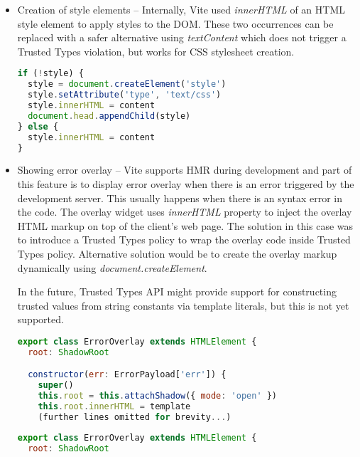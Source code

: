 \begin{itemize}
  \item Creation of style elements -- Internally, Vite used \emph{innerHTML} of an HTML style
        element to apply styles to the DOM. These two occurrences can be replaced with a
        safer alternative using \emph{textContent} which does not trigger a Trusted Types
        violation, but works for CSS stylesheet creation.

        \bigskip
        \begin{lstlisting}[language=JavaScript, caption=Creation of style elements using innerHTML in Vite \cite{commit_vite_inner_html_styles}]
if (!style) {
  style = document.createElement('style')
  style.setAttribute('type', 'text/css')
  style.innerHTML = content
  document.head.appendChild(style)
} else {
  style.innerHTML = content
}
\end{lstlisting}

  \item Showing error overlay -- Vite supports HMR during development and part of this feature is to
        display error overlay when there is an error triggered by the development server. This
        usually happens when there is an syntax error in the code. The overlay widget uses
        \emph{innerHTML} property to inject the overlay HTML markup on top of the client's web
        page. The solution in this case was to introduce a Trusted Types policy to wrap the overlay
        code inside Trusted Types policy. Alternative solution would be to create the overlay
        markup dynamically using \emph{document.createElement}.

        In the future, Trusted Types API might provide support for constructing trusted values from
        string constants via template literals, but this is not yet supported.

        \bigskip
        \begin{lstlisting}[language=JavaScript, caption=Creation of error overlay using innerHTML property \cite{commit_vite_inner_html_overlay}]
export class ErrorOverlay extends HTMLElement {
  root: ShadowRoot

  constructor(err: ErrorPayload['err']) {
    super()
    this.root = this.attachShadow({ mode: 'open' })
    this.root.innerHTML = template
    (further lines omitted for brevity...)
\end{lstlisting}

        \bigskip
        \begin{lstlisting}[language=JavaScript, caption=Creation of error overlay using Trusted Types policy \cite{commit_vite_policy_overlay}]
export class ErrorOverlay extends HTMLElement {
  root: ShadowRoot


\end{lstlisting}
\end{itemize}

